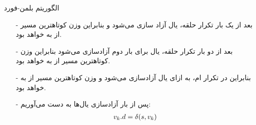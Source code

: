 \begin{frame}{‌الگوریتم بلمن-فورد}
\begin{itemize}\itemr
\item[-]
بعد از یک بار تکرار حلقه، یال
آزاد سازی می‌شود و بنابراین
وزن کوتاهترین مسیر از
به
خواهد بود.
\item[-]
بعد از دو بار تکرار حلقه، یال
برای بار دوم آزادسازی می‌شود
 بنابراین
وزن کوتاهترین مسیر از
به
خواهد بود.
\item[-]
بنابراین
 در تکرار
ام، به ازای
یال
 آزادسازی می‌شود و  
وزن کوتاهترین مسیر از
به
خواهد بود.
\item[-]
 پس از 
بار آزادسازی یال‌ها
به دست می‌آوریم:
\begin{align*}
\mathnormal{v_k.d = \delta(s,v_k)}
\end{align*}
\end{itemize}
\end{frame}

